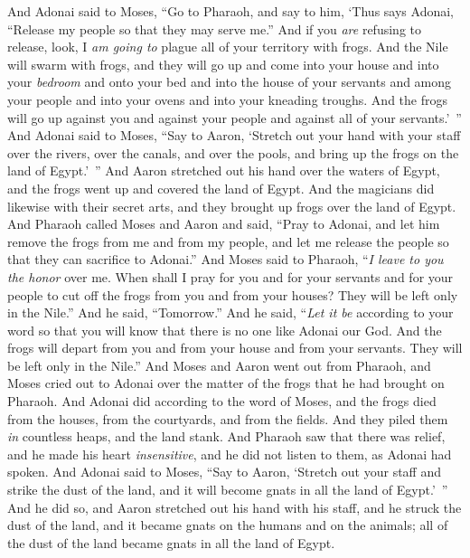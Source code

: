 \begin{biblechapter} %
  And Adonai said to Moses, “Go to Pharaoh, and say to him, ‘Thus says Adonai, “Release my people so that they may serve me.”
\verse And if you \textit{are} refusing to release, look, I \textit{am going to} plague all of your territory with frogs.
\verse And the Nile will swarm with frogs, and they will go up and come into your house and into your \textit{bedroom} and onto your bed and into the house of your servants and among your people and into your ovens and into your kneading troughs.
\verse And the frogs will go up against you and against your people and against all of your servants.’ ”
\verse And Adonai said to Moses, “Say to Aaron, ‘Stretch out your hand with your staff over the rivers, over the canals, and over the pools, and bring up the frogs on the land of Egypt.’ ”
\verse And Aaron stretched out his hand over the waters of Egypt, and the frogs went up and covered the land of Egypt.
\verse And the magicians did likewise with their secret arts, and they brought up frogs over the land of Egypt.
\verse And Pharaoh called Moses and Aaron and said, “Pray to Adonai, and let him remove the frogs from me and from my people, and let me release the people so that they can sacrifice to Adonai.”
\verse And Moses said to Pharaoh, “\textit{I leave to you the honor} over me. When shall I pray for you and for your servants and for your people to cut off the frogs from you and from your houses? They will be left only in the Nile.”
\verse And he said, “Tomorrow.” And he said, “\textit{Let it be} according to your word so that you will know that there is no one like Adonai our God.
\verse And the frogs will depart from you and from your house and from your servants. They will be left only in the Nile.”
\verse And Moses and Aaron went out from Pharaoh, and Moses cried out to Adonai over the matter of the frogs that he had brought on Pharaoh.
\verse And Adonai did according to the word of Moses, and the frogs died from the houses, from the courtyards, and from the fields.
\verse And they piled them \textit{in} countless heaps, and the land stank.
\verse And Pharaoh saw that there was relief, and he made his heart \textit{insensitive}, and he did not listen to them, as Adonai had spoken.
 And Adonai said to Moses, “Say to Aaron, ‘Stretch out your staff and strike the dust of the land, and it will become gnats in all the land of Egypt.’ ”
\verse And he did so, and Aaron stretched out his hand with his staff, and he struck the dust of the land, and it became gnats on the humans and on the animals; all of the dust of the land became gnats in all the land of Egypt.

\end{biblechapter}
